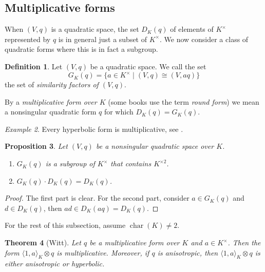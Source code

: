 \documentclass[12pt, leqno, british]{amsart}
\theoremstyle{definition}
\newtheorem{defi}{Definition}[subsection]
\theoremstyle{plain}
\newtheorem{prop}[defi]{Proposition}
\newtheorem{thm}[defi]{Theorem}
\theoremstyle{remark}
\newtheorem{eg}[defi]{Example}
\DeclareMathOperator{\charac}{char}
\begin{document}
\subsection{Multiplicative forms}
When $(V, q)$ is a quadratic space, the set $D_K(q)$ of elements of $K^\times$ represented by $q$ is in general just a subset of $K^\times$.
We now consider a class of quadratic forms where this is in fact a subgroup.
\begin{defi}
Let $(V, q)$ be a quadratic space.
We call the set
$$ G_K(q) = \lbrace a \in K^\times \mid (V, q) \cong (V, aq) \rbrace $$
the set of \emph{similarity factors of $(V, q)$}.

By a \emph{multiplicative form over $K$} (some books use the term \emph{round form}) we mean a nonsingular quadratic form $q$ for which $D_K(q) = G_K(q)$.
\end{defi}
\begin{eg}
Every hyperbolic form is multiplicative, see .
\end{eg}
\begin{prop}\label{P:GKq-properties}
Let $(V, q)$ be a nonsingular quadratic space over $K$.
\begin{enumerate}
\item $G_K(q)$ is a subgroup of $K^\times$ that contains $K^{\times 2}$.
\item $G_K(q) \cdot D_K(q) = D_K(q)$.
\end{enumerate}
\end{prop}
\begin{proof}
The first part is clear.
For the second part, consider $a \in G_K(q)$ and $d \in D_K(q)$, then $ad \in D_K(aq) = D_K(q)$.
\end{proof}
For the rest of this subsection, assume $\charac(K) \neq 2$.
\begin{thm}[Witt]\label{T:Witt-multiplicative-forms}
Let $q$ be a multiplicative form over $K$ and $a \in K^\times$.
Then the form $\langle 1, a \rangle_K \otimes q$ is multiplicative.
Moreover, if $q$ is anisotropic, then $\langle 1, a \rangle_K \otimes q$ is either anisotropic or hyperbolic.
\end{thm}
\end{document}
